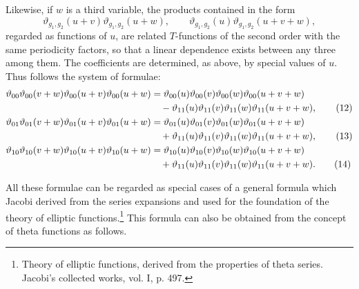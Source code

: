 \documentclass[11pt]{article}
\newcommand{\tht}{\vartheta}
\begin{document}
Likewise, if $w$ is a third variable, the products contained in the form
\[
\tht_{g_1,g_2}(u+v)\tht_{g_1,g_2}(u+w),\qquad
\tht_{g_1,g_2}(u)\tht_{g_1,g_2}(u+v+w),
\]
regarded as functions of $u$, are related $T$-functions of the second order with the same periodicity factors, so that a linear dependence exists between any three among them. The coefficients are determined, as above, by special values of $u$. Thus follows the system of formulae:
\begin{align}
\tht_{00}\tht_{00}(v+w)\tht_{00}(u+v)\tht_{00}(u+w)
&=\tht_{00}(u)\tht_{00}(v)\tht_{00}(w)\tht_{00}(u+v+w) \notag\\
&\quad -\tht_{11}(u)\tht_{11}(v)\tht_{11}(w)\tht_{11}(u+v+w), \tag{12}\\
\tht_{01}\tht_{01}(v+w)\tht_{01}(u+v)\tht_{01}(u+w)
&=\tht_{01}(u)\tht_{01}(v)\tht_{01}(w)\tht_{01}(u+v+w) \notag\\
&\quad +\tht_{11}(u)\tht_{11}(v)\tht_{11}(w)\tht_{11}(u+v+w), \tag{13}\\
\tht_{10}\tht_{10}(v+w)\tht_{10}(u+v)\tht_{10}(u+w)
&=\tht_{10}(u)\tht_{10}(v)\tht_{10}(w)\tht_{10}(u+v+w) \notag\\
&\quad +\tht_{11}(u)\tht_{11}(v)\tht_{11}(w)\tht_{11}(u+v+w). \tag{14}
\end{align}

All these formulae can be regarded as special cases of a general formula which Jacobi derived from the series expansions and used for the foundation of the theory of elliptic functions.\footnote{Theory of elliptic functions, derived from the properties of theta series. Jacobi's collected works, vol. I, p. 497.} This formula can also be obtained from the concept of theta functions as follows.
\end{document}
